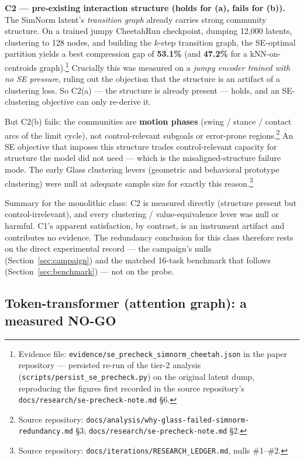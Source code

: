 \documentclass{article}
\begin{document}
\textbf{C2 --- pre-existing interaction structure (holds for (a), fails for (b)).} The SimNorm latent's \emph{transition graph} already carries strong community structure. On a trained jumpy CheetahRun checkpoint, dumping 12{,}000 latents, clustering to 128 nodes, and building the $k$-step transition graph, the SE-optimal partition yields a best compression gap of \textbf{53.1\%} (and \textbf{47.2\%} for a kNN-on-centroids graph).\footnote{Evidence file: \texttt{evidence/se\_precheck\_simnorm\_cheetah.json} in the paper repository --- persisted re-run of the tier-2 analysis (\texttt{scripts/persist\_se\_precheck.py}) on the original latent dump, reproducing the figures first recorded in the source repository's \texttt{docs/research/se-precheck-note.md} \S6.} Crucially this was measured on a \emph{jumpy encoder trained with no SE pressure}, ruling out the objection that the structure is an artifact of a clustering loss. So C2(a) --- the structure is already present --- holds, and an SE-clustering objective can only re-derive it.

But C2(b) fails: the communities are \textbf{motion phases} (swing / stance / contact arcs of the limit cycle), not control-relevant subgoals or error-prone regions.\footnote{Source repository: \texttt{docs/analysis/why-glass-failed-simnorm-redundancy.md} \S3; \texttt{docs/research/se-precheck-note.md} \S2.} An SE objective that imposes this structure trades control-relevant capacity for structure the model did not need --- which is the misaligned-structure failure mode. The early Glass clustering levers (geometric and behavioral prototype clustering) were null at adequate sample size for exactly this reason.\footnote{Source repository: \texttt{docs/iterations/RESEARCH\_LEDGER.md}, nulls \#1--\#2.}

Summary for the monolithic class: C2 is measured directly (structure present but control-irrelevant), and every clustering / value-equivalence lever was null or harmful. C1's apparent satisfaction, by contrast, is an instrument artifact and contributes no evidence. The redundancy conclusion for this class therefore rests on the direct experimental record --- the campaign's nulls (Section~\ref{sec:campaign}) and the matched 16-task benchmark that follows (Section~\ref{sec:benchmark}) --- not on the probe.



\subsection{Token-transformer (attention graph): a measured NO-GO}
\label{sec:transformer}
\end{document}
